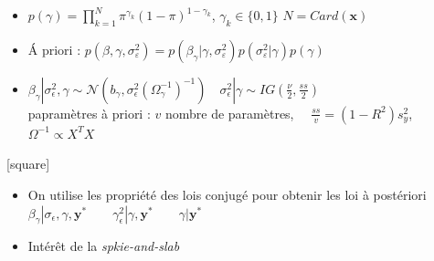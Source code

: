 \begin{frame}
        \begin{itemize}
            \item  $\displaystyle p(\gamma)=\prod_{k=1}^{N} \pi^{\gamma_k}(1-\pi)^{1-\gamma_k}$, $\gamma_k \in \{0,1 \}$ {\small $N = Card(\mathbf{x})$} 
            \item \'A priori : $p\left(\beta, \gamma, \sigma_{\varepsilon}^{2}\right)=p\left(\beta_{\gamma} | \gamma, \sigma_{\varepsilon}^{2}\right) p\left(\sigma_{\varepsilon}^{2} | \gamma\right) p(\gamma)$ 
            \item $
                \beta_{\gamma}\left|\sigma_{\epsilon}^{2}, \gamma \sim \mathcal{N}\left(b_{\gamma},
                \sigma_{\epsilon}^{2}\left(\Omega_{\gamma}^{-1}\right)^{-1}\right) \quad \sigma_{\epsilon}^{2}\right| \gamma \sim IG\left(\frac{\nu}{2}, \frac{s s}{2}\right)
                $ \\ \vspace{0.2cm}
                {\centering \tiny
                papramètres à priori : $v$ nombre de paramètres,$\quad$ $\frac{s s}{v}=\left(1-R^{2}\right) s_{y}^{2}$, $\quad$         $\Omega^{-1} \propto X^{T} X$ }
        \end{itemize}
    
        [square]
   
    \begin{itemize}
        
        \item On utilise les propriété des lois conjugé pour obtenir les loi à postériori \\ \vspace{0.1cm}
        {\centering
        $\beta_{\gamma} | \sigma_{\epsilon}, \gamma, \mathbf{y}^{*} \quad \quad \gamma_\epsilon^{2} | \gamma, \mathbf{y}^{*} \quad \quad \gamma | \mathbf{y}^{*}$}
        \item Intérêt de la \textit{spkie-and-slab}
    \end{itemize}

\end{frame}


